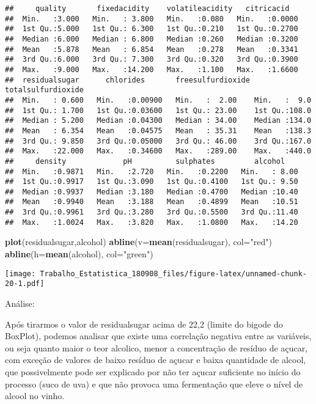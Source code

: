 \documentclass[]{article}
\newenvironment{Shaded}{\begin{snugshade}}{\end{snugshade}}
\newcommand{\KeywordTok}[1]{\textcolor[rgb]{0.13,0.29,0.53}{\textbf{#1}}}
\newcommand{\DataTypeTok}[1]{\textcolor[rgb]{0.13,0.29,0.53}{#1}}
\newcommand{\StringTok}[1]{\textcolor[rgb]{0.31,0.60,0.02}{#1}}
\newcommand{\NormalTok}[1]{#1}
\begin{document}
\begin{verbatim}
##     quality       fixedacidity    volatileacidity   citricacid    
##  Min.   :3.000   Min.   : 3.800   Min.   :0.080   Min.   :0.0000  
##  1st Qu.:5.000   1st Qu.: 6.300   1st Qu.:0.210   1st Qu.:0.2700  
##  Median :6.000   Median : 6.800   Median :0.260   Median :0.3200  
##  Mean   :5.878   Mean   : 6.854   Mean   :0.278   Mean   :0.3341  
##  3rd Qu.:6.000   3rd Qu.: 7.300   3rd Qu.:0.320   3rd Qu.:0.3900  
##  Max.   :9.000   Max.   :14.200   Max.   :1.100   Max.   :1.6600  
##  residualsugar      chlorides       freesulfurdioxide totalsulfurdioxide
##  Min.   : 0.600   Min.   :0.00900   Min.   :  2.00    Min.   :  9.0     
##  1st Qu.: 1.700   1st Qu.:0.03600   1st Qu.: 23.00    1st Qu.:108.0     
##  Median : 5.200   Median :0.04300   Median : 34.00    Median :134.0     
##  Mean   : 6.354   Mean   :0.04575   Mean   : 35.31    Mean   :138.3     
##  3rd Qu.: 9.850   3rd Qu.:0.05000   3rd Qu.: 46.00    3rd Qu.:167.0     
##  Max.   :22.000   Max.   :0.34600   Max.   :289.00    Max.   :440.0     
##     density             pH          sulphates         alcohol     
##  Min.   :0.9871   Min.   :2.720   Min.   :0.2200   Min.   : 8.00  
##  1st Qu.:0.9917   1st Qu.:3.090   1st Qu.:0.4100   1st Qu.: 9.50  
##  Median :0.9937   Median :3.180   Median :0.4700   Median :10.40  
##  Mean   :0.9940   Mean   :3.188   Mean   :0.4899   Mean   :10.51  
##  3rd Qu.:0.9961   3rd Qu.:3.280   3rd Qu.:0.5500   3rd Qu.:11.40  
##  Max.   :1.0024   Max.   :3.820   Max.   :1.0800   Max.   :14.20
\end{verbatim}

\begin{Shaded}
\begin{Highlighting}[]
\KeywordTok{plot}\NormalTok{(residualsugar,alcohol)}
\KeywordTok{abline}\NormalTok{(}\DataTypeTok{v=}\KeywordTok{mean}\NormalTok{(residualsugar), }\DataTypeTok{col=}\StringTok{"red"}\NormalTok{)}
\KeywordTok{abline}\NormalTok{(}\DataTypeTok{h=}\KeywordTok{mean}\NormalTok{(alcohol), }\DataTypeTok{col=}\StringTok{"green"}\NormalTok{)}
\end{Highlighting}
\end{Shaded}

\texttt{[image: Trabalho\_Estatistica\_180908\_files/figure-latex/unnamed-chunk-20-1.pdf]}

Análise:

Após tirarmos o valor de residualsugar acima de 22,2 (limite do bigode
do BoxPlot), podemos analisar que existe uma correlação negativa entre
as variáveis, ou seja quanto maior o teor alcolico, menor a concentração
de resíduo de açucar, com exceção de valores de baixo resíduo de açucar
e baixa quantidade de alcool, que possivelmente pode ser explicado por
não ter açucar suficiente no início do processo (suco de uva) e que não
provoca uma fermentação que eleve o nível de alcool no vinho.
\end{document}
